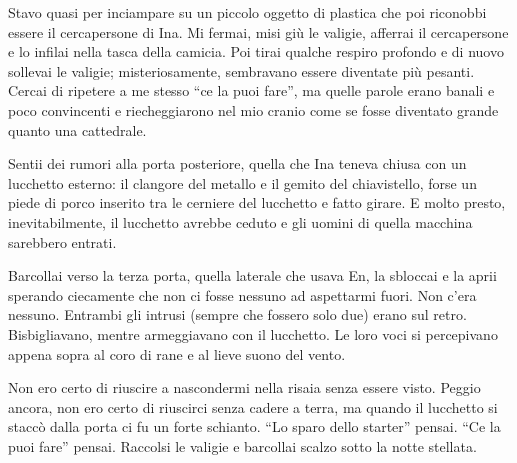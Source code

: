 Stavo quasi per inciampare su un piccolo oggetto di plastica che poi
riconobbi essere il cercapersone di Ina. Mi fermai, misi giù le valigie,
afferrai il cercapersone e lo infilai nella tasca della camicia. Poi
tirai qualche respiro profondo e di nuovo sollevai le valigie;
misteriosamente, sembravano essere diventate più pesanti. Cercai di
ripetere a me stesso ``ce la puoi fare'', ma quelle parole erano banali
e poco convincenti e riecheggiarono nel mio cranio come se fosse
diventato grande quanto una cattedrale.

Sentii dei rumori alla porta posteriore, quella che Ina teneva chiusa
con un lucchetto esterno: il clangore del metallo e il gemito del
chiavistello, forse un piede di porco inserito tra le cerniere del
lucchetto e fatto girare. E molto presto, inevitabilmente, il lucchetto
avrebbe ceduto e gli uomini di quella macchina sarebbero entrati.

Barcollai verso la terza porta, quella laterale che usava En, la
sbloccai e la aprii sperando ciecamente che non ci fosse nessuno ad
aspettarmi fuori. Non c'era nessuno. Entrambi gli intrusi (sempre che
fossero solo due) erano sul retro. Bisbigliavano, mentre armeggiavano
con il lucchetto. Le loro voci si percepivano appena sopra al coro di
rane e al lieve suono del vento.

Non ero certo di riuscire a nascondermi nella risaia senza essere visto.
Peggio ancora, non ero certo di riuscirci senza cadere a terra, ma
quando il lucchetto si staccò dalla porta ci fu un forte schianto. ``Lo
sparo dello starter'' pensai. ``Ce la puoi fare'' pensai. Raccolsi le
valigie e barcollai scalzo sotto la notte stellata.